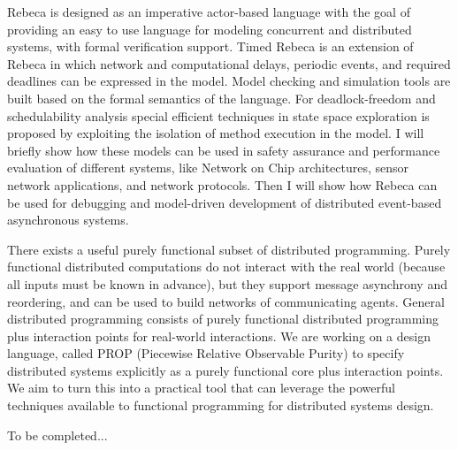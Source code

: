 \documentclass[a4paper,UKenglish]{dagrep-v2018}
\begin{document}
Rebeca is designed as an imperative actor-based language with the goal of providing an easy to use language for modeling concurrent and distributed systems, with formal verification support.
Timed Rebeca is an extension of Rebeca in which network and computational delays, periodic events, and required deadlines can be expressed in the model. Model checking and simulation tools are built based on the formal semantics of the language. For deadlock-freedom and schedulability analysis special efficient techniques in state space exploration is proposed by exploiting the isolation of method execution in the model. I will briefly show how these models can be used in safety assurance and performance evaluation of different systems, like Network on Chip architectures, sensor network applications, and network protocols. Then I will show how Rebeca can be used for debugging and model-driven development of distributed event-based asynchronous systems.


\license

There exists a useful purely functional subset of distributed programming.  Purely functional distributed computations do not interact with the real world (because all inputs must be known in advance), but they support message asynchrony and reordering, and can be used to build networks of communicating agents.  General distributed programming consists of purely functional distributed programming plus interaction points for real-world interactions.  We are working on a design language, called PROP (Piecewise Relative Observable Purity) to specify distributed systems explicitly as a purely functional core plus interaction points.  We aim to turn this into a practical tool that can leverage the powerful techniques available to functional programming for distributed systems design.


\license

To be completed...

\end{document}
